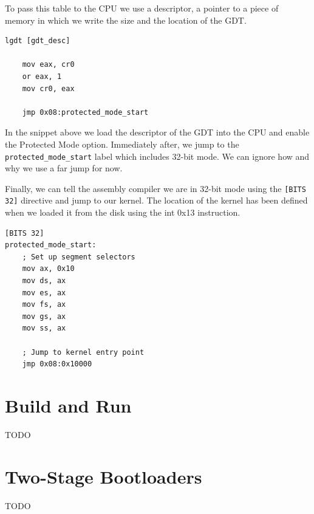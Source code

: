 To pass this table to the CPU we use a descriptor, a pointer to a piece of memory in which we write the size and the 
location of the GDT.

\begin{lstlisting}[caption={Loading GDT and Enabling Protected Mode}]
    lgdt [gdt_desc]
    
    mov eax, cr0
    or eax, 1
    mov cr0, eax

    jmp 0x08:protected_mode_start
\end{lstlisting}

In the snippet above we load the descriptor of the GDT into the CPU and enable the Protected Mode option.
Immediately after, we jump to the \texttt{protected\_mode\_start} label which includes 32-bit mode. We can ignore how and why
we use a far jump for now.

Finally, we can tell the assembly compiler we are in 32-bit mode using the \texttt{[BITS 32]} directive and jump
to our kernel. The location of the kernel has been defined when we loaded it from the disk using the int 0x13 instruction.

\begin{lstlisting}[caption={Initializing Registers and Jumping to Kernel}]
[BITS 32]
protected_mode_start:
    ; Set up segment selectors
    mov ax, 0x10
    mov ds, ax
    mov es, ax
    mov fs, ax
    mov gs, ax
    mov ss, ax

    ; Jump to kernel entry point
    jmp 0x08:0x10000
\end{lstlisting}

\section{Build and Run}

TODO


\section{Two-Stage Bootloaders}

TODO

